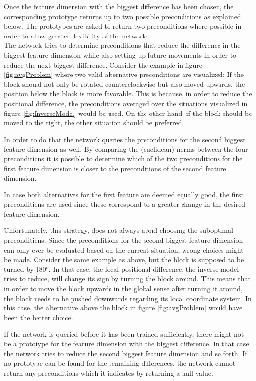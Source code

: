 Once the feature dimension with the biggest difference has been chosen, the corresponding prototype returns up to two possible preconditions as explained below.
The prototypes are asked to return two preconditions where possible in order to allow greater flexibility of the network: \\
The network tries to determine preconditions that reduce the difference in the biggest feature dimension while also setting up future movements in order to reduce the next biggest difference. Consider the example in figure \ref{fig:avgProblem} where two valid alternative preconditions are visualized: If the block should not only be rotated counterclockwise but also moved upwards, the position below the block is more favorable. This is because, in order to reduce the positional difference, the preconditions averaged over the situations visualized in figure \ref{fig:InverseModel} would be used. On the other hand, if the block should be moved to the right, the other situation should be preferred.

In order to do that the network queries the preconditions for the second biggest feature dimension as well. By comparing the (euclidean) norms between the four preconditions it is possible to determine which of the two preconditions for the first feature dimension is closer to the preconditions of the second feature dimension.  

In case both alternatives for the first feature are deemed equally good, the first preconditions are used since these correspond to a greater change in the desired feature dimension.

Unfortunately, this strategy, does not always avoid choosing the suboptimal preconditions. Since the preconditions for the second biggest feature dimension can only ever be evaluated based on the current situation, wrong choices might be made. Consider the same example as above, but the block is supposed to be turned by 180°. In that case, the local positional difference, the inverse model tries to reduce, will change its sign by turning the block around. This means that in order to move the block upwards in the global sense after turning it around, the block needs to be pushed downwards regarding its local coordinate system. In this case, the alternative above the block in figure \ref{fig:avgProblem} would have been the better choice.

If the network is queried before it has been trained sufficiently, there might not be a prototype for the feature dimension with the biggest difference. In that case the network tries to reduce the second biggest feature dimension and so forth. If no prototype can be found for the remaining differences, the network cannot return any preconditions which it indicates by returning a null value. 

